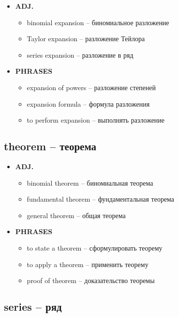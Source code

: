 \documentclass[a4paper, 10pt]{article}
\theoremstyle{definition}
\theoremstyle{plain}
\theoremstyle{remark}
\begin{document}
\begin{itemize}
    \item \textbf{ADJ.}
    \begin{itemize}
        \item binomial expansion – биномиальное разложение
        \item Taylor expansion – разложение Тейлора
        \item series expansion – разложение в ряд
    \end{itemize}
    
    \item \textbf{PHRASES}
    \begin{itemize}
        \item expansion of powers – разложение степеней
        \item expansion formula – формула разложения
        \item to perform expansion – выполнять разложение
    \end{itemize}
\end{itemize}

\subsection{theorem – теорема}

\begin{itemize}
    \item \textbf{ADJ.}
    \begin{itemize}
        \item binomial theorem – биномиальная теорема
        \item fundamental theorem – фундаментальная теорема
        \item general theorem – общая теорема
    \end{itemize}
    
    \item \textbf{PHRASES}
    \begin{itemize}
        \item to state a theorem – сформулировать теорему
        \item to apply a theorem – применить теорему
        \item proof of theorem – доказательство теоремы
    \end{itemize}
\end{itemize}

\subsection{series – ряд}
\end{document}
